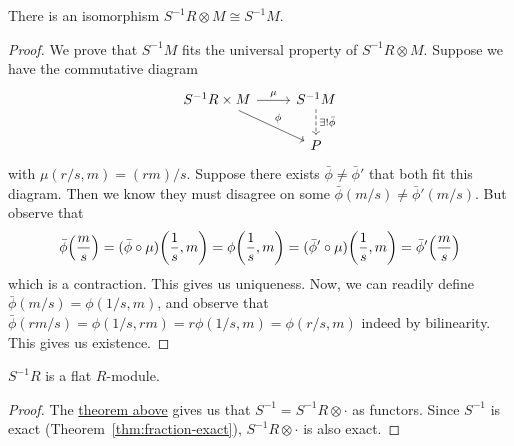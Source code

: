 \begin{theorem}\label{thm:fraction-isomorphism}
    There is an isomorphism \(S^{-1}R \otimes M \cong S^{-1}M\).
\end{theorem}
\begin{proof}
    We prove that \(S^{-1}M\) fits the universal property of \(S^{-1}R \otimes M\).
    Suppose we have the commutative diagram
    \begin{equation*}
        \begin{tikzcd}
            S^{-1}R \times M \arrow{r}{\mu} \arrow{rd}{\phi} &
            S^{-1}M \arrow[dashrightarrow]{d}{\exists!\bar{\phi}} \\
            & P
        \end{tikzcd}
    \end{equation*}
    with \(\mu(r/s,m) = (rm)/s\).
    Suppose there exists \(\bar{\phi}\neq\bar{\phi}'\) that both fit this diagram.
    Then we know they must disagree on some \(\bar{\phi}(m/s)\neq\bar{\phi}'(m/s)\).
    But observe that
    \begin{equation*}
        \bar{\phi}\pqty{\frac{m}{s}} = (\bar{\phi}\circ\mu)\pqty{\frac{1}{s},m}
        = \phi\pqty{\frac{1}{s},m} = (\bar{\phi}'\circ\mu)\pqty{\frac{1}{s},m}
        = \bar{\phi}'\pqty{\frac{m}{s}}
    \end{equation*}
    which is a contraction.
    This gives us uniqueness.
    Now, we can readily define \(\bar{\phi}(m/s) = \phi(1/s,m)\),
    and observe that \(\bar{\phi}(rm/s) = \phi(1/s,rm) = r\phi(1/s,m) = \phi(r/s,m)\)
    indeed by bilinearity.
    This gives us existence.
\end{proof}
\begin{corollary}
    \(S^{-1}R\) is a flat \(R\)-module.
\end{corollary}
\begin{proof}
    The \hyperref[thm:fraction-isomorphism]{theorem above}
    gives us that \(S^{-1} = S^{-1}R \otimes \cdot\) as functors.
    Since \(S^{-1}\) is exact (Theorem~\ref{thm:fraction-exact}),
    \(S^{-1}R \otimes \cdot\) is also exact.
\end{proof}

    
